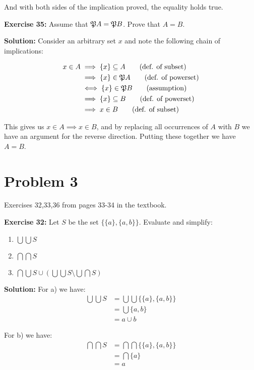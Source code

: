 \documentclass{article}
\begin{document}
And with both sides of the implication proved, the equality holds true.
\bigskip
\pagebreak

\noindent\textbf{Exercise 35:} Assume that $\mathfrak PA = \mathfrak PB$. Prove that $A = B$.
\bigskip

\noindent\textbf{Solution:} Consider an arbitrary set $x$ and note the following chain of implications:

\begin{align*}
    x\in A&\implies\{x\}\subseteq A\tag{def. of subset}\\
    &\implies\{x\}\in\mathfrak PA\tag{def. of powerset}\\
    &\iff\{x\}\in\mathfrak PB\tag{assumption}\\
    &\implies\{x\}\subseteq B\tag{def. of powerset}\\
    &\implies x\in B\tag{def. of subset}
\end{align*}

This gives us $x\in A\implies x\in B$, and by replacing all occurrences of $A$ with $B$ we have an argument for the reverse direction. Putting these together we have $A=B$.

\section*{Problem 3}
Exercises 32,33,36 from pages 33-34 in the textbook.
\bigskip

\noindent\textbf{Exercise 32:} Let $S$ be the set $\{\{a\}, \{a, b\}\}$. Evaluate and simplify:

\begin{enumerate}[label=\alph*)]
    \item $\bigcup\bigcup S$
    \item $\bigcap\bigcap S$
    \item $\bigcap\bigcup S\cup (\bigcup\bigcup S\setminus\bigcup\bigcap S)$
\end{enumerate}
\bigskip

\noindent\textbf{Solution:} For a) we have:
\begin{align*}
    \bigcup\bigcup S&=\bigcup\bigcup\{\{a\}, \{a, b\}\}\\
    &=\bigcup\{a,b\}\\
    &=a\cup b
\end{align*}

For b) we have:
\begin{align*}
    \bigcap\bigcap S&=\bigcap\bigcap\{\{a\}, \{a, b\}\}\\
    &=\bigcap\{a\}\\
    &=a
\end{align*}
\end{document}
